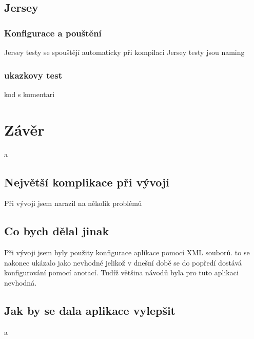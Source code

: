 \documentclass[czech,master,public,dept460,male,cpdeclaration,twoside]{diploma}
\begin{document}
\subsection{Jersey}
\subsubsection{Konfigurace a pouštění}
Jersey testy se spouštějí automaticky při kompilaci 
Jersey testy jsou 
naming 

\subsubsection{ukazkovy test}
kod s komentari



\section{Závěr}
a

\subsection{Největší komplikace při vývoji}
Při vývoji jsem narazil na několik problémů

\subsection{Co bych dělal jinak}
Při vývoji jsem byly použity konfigurace aplikace pomocí XML souborů. to se nakonec ukázalo jako nevhodné jelikož v dnešní době se do popředí dostává konfigurování pomocí anotací. Tudíž většina návodů byla pro tuto aplikaci nevhodná.

\subsection{Jak by se dala aplikace vylepšit}
a


\newcommand{\registerToBib}[4]
{
\bibitem{#1}
	{\bf #2}
	{[cit. #3].}
	{\em Dostupne z: #4}
}
\end{document}
